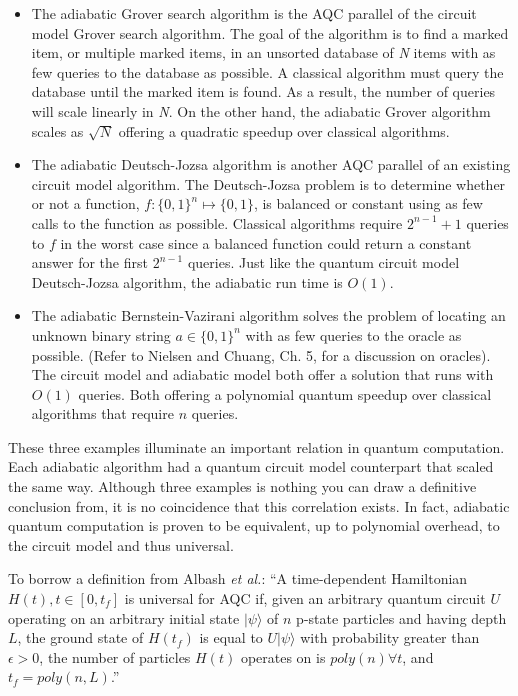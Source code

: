 \documentclass[%
 reprint,
 amsmath,amssymb,
 aps,
]{revtex4-1}
\begin{document}
   \begin{itemize}
   	\item The adiabatic Grover search algorithm is the AQC parallel of the circuit model Grover search algorithm. The goal of the algorithm is to find a marked item, or multiple marked items, in an unsorted database of \textit{N} items with as few queries to the database as possible. A classical algorithm must query the database until the marked item is found. As a result, the number of queries will scale linearly in \textit{N}. On the other hand, the adiabatic Grover algorithm scales as $\sqrt{N}$ offering a quadratic speedup over classical algorithms.
   \item The adiabatic Deutsch-Jozsa algorithm is another AQC parallel of an existing circuit model algorithm. The Deutsch-Jozsa problem is to determine whether or not a function, $f: \lbrace0,1\rbrace^n \longmapsto \lbrace0,1\rbrace$, is balanced or constant using as few calls to the function as possible. Classical algorithms require $2^{n-1} + 1$ queries to $f$ in the worst case since a balanced function could return a constant answer for the first $2^{n-1}$ queries. Just like the quantum circuit model Deutsch-Jozsa algorithm, the adiabatic run time is $O(1)$.
   \item The adiabatic Bernstein-Vazirani algorithm solves the problem of locating an unknown binary string $ a \in \lbrace0,1\rbrace^n  $ with as few queries to the oracle as possible. (Refer to Nielsen and Chuang, Ch. 5, for a discussion on oracles). The circuit model and adiabatic model both offer a solution that runs with $O(1)$ queries. Both offering a polynomial quantum speedup over classical algorithms that require $n$ queries.
   \end{itemize}
   
   These three examples illuminate an important relation in quantum computation. Each adiabatic algorithm had a quantum circuit model counterpart that scaled the same way. Although three examples is nothing you can draw a definitive conclusion from, it is no coincidence that this correlation exists. In fact, adiabatic quantum computation is proven to be equivalent, up to polynomial overhead, to the circuit model and thus universal\cite{Aharanov2007}. 
   
   To borrow a definition from Albash \textit{et al.}: ``A time-dependent Hamiltonian $H(t), t\in [0,t_{f}]$ is universal for AQC if, given an arbitrary quantum circuit $U$ operating on an arbitrary initial state $\vert\psi\rangle$ of $n$ p-state particles and having depth $L$, the ground state of $H(t_f)$ is equal to $U\vert\psi\rangle$ with probability greater than $\epsilon>0$, the number of particles $H(t)$ operates on is $poly(n) \forall t$, and $t_f = poly(n,L)$\cite{RevModPhys.90.015002}.''
   
\end{document}
